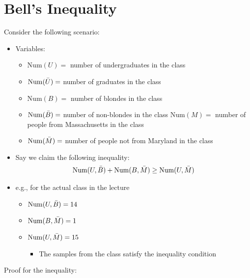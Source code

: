 \documentclass[a4paper]{article}
\begin{document}
\section{Bell's Inequality}
Consider the following scenario:
\begin{itemize}
    \item Variables:
    \begin{itemize}
        \item $\mathrm{Num}(U)=$ number of undergraduates in the class
        \item $\mathrm{Num}(\Bar{U})=$ number of graduates in the class
        \item $\mathrm{Num}(B)=$ number of blondes in the class
        \item $\mathrm{Num}(\Bar{B})=$ number of non-blondes in the class
        \uten $\mathrm{Num}(M)=$ number of people from Massachusetts in the class
        \item $\mathrm{Num}(\Bar{M})=$ number of people not from Maryland in the class
    \end{itemize}
    \item Say we claim the following inequality: 
        \begin{equation}
            \mathrm{Num}(U,\Bar{B}) + \mathrm{Num}(B,\Bar{M}) \geq \mathrm{Num}(U,\Bar{M})
        \end{equation}
    \item e.g., for the actual class in the lecture
        \begin{itemize}
            \item $\mathrm{Num}(U,\Bar{B})=14$
            \item $\mathrm{Num}(B,\Bar{M})=1$
            \item $\mathrm{Num}(U,\Bar{M})=15$ 
                \begin{itemize}
                    \item The samples from the class satisfy the inequality condition 
                \end{itemize}
        \end{itemize}
 \end{itemize}   
Proof for the inequality:
\end{document}
